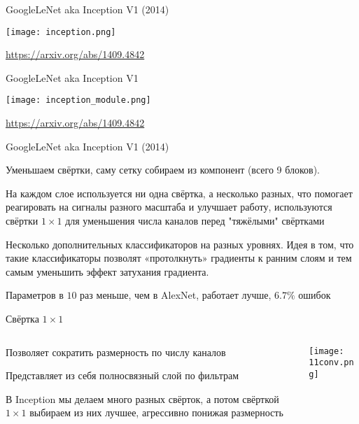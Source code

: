 \documentclass[notes,12pt, aspectratio=169]{beamer}
\newenvironment{wideitemize}{\itemize\addtolength{\itemsep}{10pt}}{\enditemize}
\begin{document}
\begin{frame}{GoogleLeNet aka Inception V1  (2014)}
	\begin{center}
		\texttt{[image: inception.png]}
	\end{center}
\vfill %
\footnotesize
\color{blue} \url{https://arxiv.org/abs/1409.4842}
\end{frame}


\begin{frame}{GoogleLeNet aka Inception V1}
\begin{center}
	\texttt{[image: inception\_module.png]}
\end{center}
\vfill %
\footnotesize
\color{blue} \url{https://arxiv.org/abs/1409.4842}
\end{frame}


\begin{frame}{GoogleLeNet aka Inception V1  (2014)}
\begin{wideitemize}
	
	\item  Уменьшаем свёртки, саму \alert{сетку собираем из компонент}  (всего 9 блоков).
	
	\item  На каждом слое используется ни одна свёртка, а несколько разных, что помогает реагировать на сигналы разного масштаба и улучшает работу, используются  \alert{свёртки $1 \times 1$} для уменьшения числа каналов перед "тяжёлыми" свёртками 
	
	\item \alert{Несколько дополнительных классификаторов на разных уровнях.} Идея в том, что такие классификаторы позволят «протолкнуть» градиенты к ранним слоям и тем самым уменьшить эффект затухания градиента.
	
	\item  Параметров  в $10$ раз меньше, чем в AlexNet, работает лучше, $6.7\%$ ошибок 
\end{wideitemize}
\end{frame}


\begin{frame}{Свёртка $1 \times 1$}
\begin{columns}[T] %
	\begin{column}{.4\textwidth}
			\begin{wideitemize}
				\item  Позволяет сократить размерность по числу каналов
				\item  Представляет из себя полносвязный слой по фильтрам 
				\item  В Inception мы делаем много разных свёрток, а потом свёрткой $1 \times 1$ выбираем из них лучшее, агрессивно понижая размерность
			\end{wideitemize}
	\end{column}%
	\hfill%
	\begin{column}{.6\textwidth}
		 \texttt{[image: 11conv.png]}
	\end{column}%
\end{columns}
\end{frame}
\end{document}

